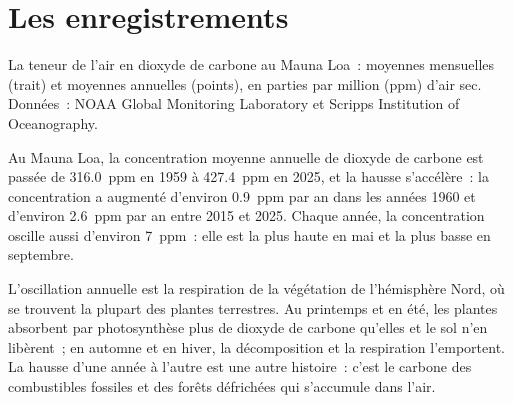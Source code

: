 \section{Les enregistrements}

\begin{omfigure}

{\small La teneur de l'air en dioxyde de carbone au Mauna Loa~: moyennes
mensuelles (trait) et moyennes annuelles (points), en parties par million
(ppm) d'air sec. Données~: NOAA Global Monitoring Laboratory et Scripps
Institution of Oceanography.}
\end{omfigure}

\begin{proposition}\label{prop:g12:climate-change:co2}
Au Mauna Loa, la concentration moyenne annuelle de dioxyde de carbone est
passée de \qty{316.0}{ppm} en 1959 à \qty{427.4}{ppm} en 2025, et la hausse
s'accélère~: la concentration a augmenté d'environ \qty{0.9}{ppm} par an
dans les années 1960 et d'environ \qty{2.6}{ppm} par an entre 2015 et 2025.
Chaque année, la concentration oscille aussi d'environ \qty{7}{ppm}~: elle
est la plus haute en mai et la plus basse en septembre.
\end{proposition}

\begin{remark}\label{rem:g12:climate-change:teeth}
L'oscillation annuelle est la respiration de la végétation de l'hémisphère
Nord, où se trouvent la plupart des plantes terrestres. Au printemps et en
été, les plantes absorbent par photosynthèse plus de dioxyde de carbone
qu'elles et le sol n'en libèrent~; en automne et en hiver, la
décomposition et la respiration l'emportent. La hausse d'une année à
l'autre est une autre histoire~: c'est le carbone des combustibles
fossiles et des forêts défrichées qui s'accumule dans l'air.
\end{remark}

